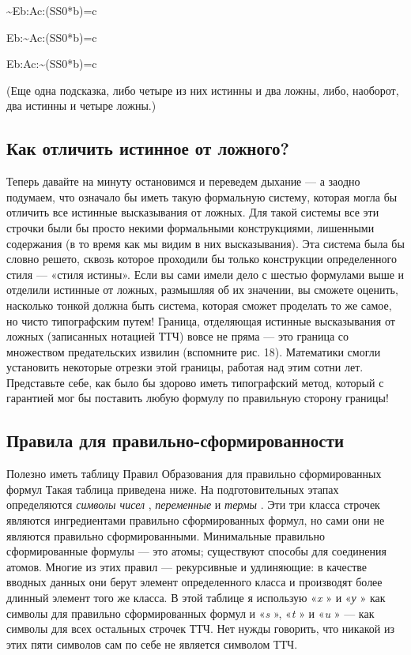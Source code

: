 \documentclass[../main.tex]{subfiles}
\begin{document}
\textasciitilde Eb:Ac:(SS0*b)=c

Eb:\textasciitilde Ac:(SS0*b)=c

Eb:Ac:\textasciitilde(SS0*b)=c

(Еще одна подсказка, либо четыре из них истинны и два ложны, либо, наоборот, два истинны и четыре ложны.)


\subsection{Как отличить истинное от ложного?}

Теперь давайте на минуту остановимся и переведем дыхание --- а заодно подумаем, что означало бы иметь такую формальную систему, которая могла бы отличить все истинные высказывания от ложных. Для такой системы все эти строчки были бы просто некими формальными конструкциями, лишенными содержания (в то время как мы видим в них высказывания). Эта система была бы словно решето, сквозь которое проходили бы только конструкции определенного стиля --- «стиля истины». Если вы сами имели дело с шестью формулами выше и отделили истинные от ложных, размышляя об их значении, вы сможете оценить, насколько тонкой должна быть система, которая сможет проделать то же самое, но чисто типографским путем! Граница, отделяющая истинные высказывания от ложных (записанных нотацией ТТЧ) вовсе не пряма --- это граница со множеством предательских извилин (вспомните рис. 18). Математики смогли установить некоторые отрезки этой границы, работая над этим сотни лет. Представьте себе, как было бы здорово иметь типографский метод, который с гарантией мог бы поставить любую формулу по правильную сторону границы!


\subsection{Правила для правильно-сформированности}

Полезно иметь таблицу Правил Образования для правильно сформированных формул Такая таблица приведена ниже. На подготовительных этапах определяются \emph{символы чисел} , \emph{переменные} и \emph{термы} . Эти три класса строчек являются ингредиентами правильно сформированных формул, но сами они не являются правильно сформированными. Минимальные правильно сформированные формулы --- это атомы; существуют способы для соединения атомов. Многие из этих правил --- рекурсивные и удлиняющие: в качестве вводных данных они берут элемент определенного класса и производят более длинный элемент того же класса. В этой таблице я использую «\emph{x} » и «\emph{у} » как символы для правильно сформированных формул и «\emph{s} », «\emph{t} » и «\emph{u} » --- как символы для всех остальных строчек ТТЧ. Нет нужды говорить, что никакой из этих пяти символов сам по себе не является символом ТТЧ.
\end{document}
